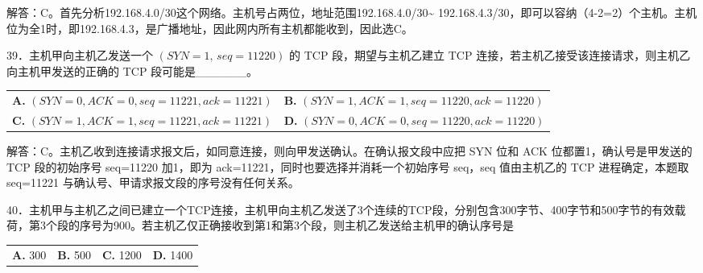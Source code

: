 \documentclass[UTF8,11pt]{ctexart}
\begin{document}
解答：C。首先分析192.168.4.0/30这个网络。主机号占两位，地址范围192.168.4.0/30\textasciitilde{} 192.168.4.3/30，即可以容纳（4-2=2）个主机。主机位为全1时，即192.168.4.3，是广播地址，因此网内所有主机都能收到，因此选C。


39．主机甲向主机乙发送一个 \(\displaystyle (SYN=1,\allowbreak \,seq=11220)\) 的 TCP 段，期望与主机乙建立 TCP 连接，若主机乙接受该连接请求，则主机乙向主机甲发送的正确的 TCP 段可能是\_\_\_\_\_\_。


\begin{center}\begin{tabular}{>{\raggedright\arraybackslash}p{\dimexpr(\linewidth-4\tabcolsep)/2\relax}>{\raggedright\arraybackslash}p{\dimexpr(\linewidth-4\tabcolsep)/2\relax}}
\textbf{A.} \(\displaystyle (SYN=0,\allowbreak ACK=0,\allowbreak seq=11221,\allowbreak ack=11221)\) & \textbf{B.} \(\displaystyle (SYN=1,\allowbreak ACK=1,\allowbreak seq=11220,\allowbreak ack=11220)\)\\[.35em]
\textbf{C.} \(\displaystyle (SYN=1,\allowbreak ACK=1,\allowbreak seq=11221,\allowbreak ack=11221)\) & \textbf{D.} \(\displaystyle (SYN=0,\allowbreak ACK=0,\allowbreak seq=11220,\allowbreak ack=11220)\)\\[.35em]\end{tabular}\end{center}

解答：C。主机乙收到连接请求报文后，如同意连接，则向甲发送确认。在确认报文段中应把 SYN 位和 ACK 位都置1，确认号是甲发送的 TCP 段的初始序号 seq=11220 加1，即为 ack=11221，同时也要选择并消耗一个初始序号 seq，seq 值由主机乙的 TCP 进程确定，本题取 seq=11221 与确认号、甲请求报文段的序号没有任何关系。


40．主机甲与主机乙之间已建立一个TCP连接，主机甲向主机乙发送了3个连续的TCP段，分别包含300字节、400字节和500字节的有效载荷，第3个段的序号为900。若主机乙仅正确接收到第1和第3个段，则主机乙发送给主机甲的确认序号是


\begin{center}\begin{tabular}{>{\raggedright\arraybackslash}p{\dimexpr(\linewidth-8\tabcolsep)/4\relax}>{\raggedright\arraybackslash}p{\dimexpr(\linewidth-8\tabcolsep)/4\relax}>{\raggedright\arraybackslash}p{\dimexpr(\linewidth-8\tabcolsep)/4\relax}>{\raggedright\arraybackslash}p{\dimexpr(\linewidth-8\tabcolsep)/4\relax}}
\textbf{A.} 300 & \textbf{B.} 500 & \textbf{C.} 1200 & \textbf{D.} 1400\\[.35em]\end{tabular}\end{center}
\end{document}
